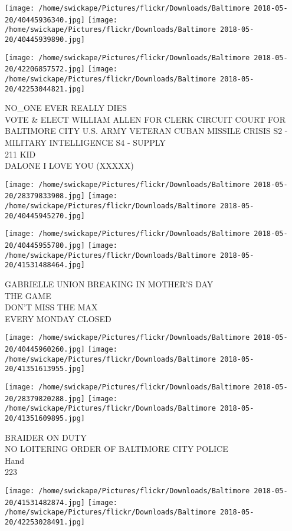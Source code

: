 \documentclass[10pt,letterpaper]{article}
\begin{document}
\texttt{[image: /home/swickape/Pictures/flickr/Downloads/Baltimore 2018-05-20/40445936340.jpg]}
\texttt{[image: /home/swickape/Pictures/flickr/Downloads/Baltimore 2018-05-20/40445939890.jpg]}

\texttt{[image: /home/swickape/Pictures/flickr/Downloads/Baltimore 2018-05-20/42206857572.jpg]}
\texttt{[image: /home/swickape/Pictures/flickr/Downloads/Baltimore 2018-05-20/42253044821.jpg]}

NO\_ONE EVER REALLY DIES\\
VOTE \& ELECT WILLIAM ALLEN FOR CLERK CIRCUIT COURT FOR BALTIMORE CITY U.S. ARMY VETERAN CUBAN MISSILE CRISIS S2 {-} MILITARY INTELLIGENCE S4 {-} SUPPLY\\
211 KID\\
DALONE I LOVE YOU (XXXXX)
\pagebreak

\texttt{[image: /home/swickape/Pictures/flickr/Downloads/Baltimore 2018-05-20/28379833908.jpg]}
\texttt{[image: /home/swickape/Pictures/flickr/Downloads/Baltimore 2018-05-20/40445945270.jpg]}

\texttt{[image: /home/swickape/Pictures/flickr/Downloads/Baltimore 2018-05-20/40445955780.jpg]}
\texttt{[image: /home/swickape/Pictures/flickr/Downloads/Baltimore 2018-05-20/41531488464.jpg]}

GABRIELLE UNION BREAKING IN MOTHER'S DAY\\
THE GAME\\
DON'T MISS THE MAX\\
EVERY MONDAY CLOSED
\pagebreak

\texttt{[image: /home/swickape/Pictures/flickr/Downloads/Baltimore 2018-05-20/40445960260.jpg]}
\texttt{[image: /home/swickape/Pictures/flickr/Downloads/Baltimore 2018-05-20/41351613955.jpg]}

\texttt{[image: /home/swickape/Pictures/flickr/Downloads/Baltimore 2018-05-20/28379820288.jpg]}
\texttt{[image: /home/swickape/Pictures/flickr/Downloads/Baltimore 2018-05-20/41351609895.jpg]}

BRAIDER ON DUTY\\
NO LOITERING ORDER OF BALTIMORE CITY POLICE\\
Hand\\
223
\pagebreak

\texttt{[image: /home/swickape/Pictures/flickr/Downloads/Baltimore 2018-05-20/41531482874.jpg]}
\texttt{[image: /home/swickape/Pictures/flickr/Downloads/Baltimore 2018-05-20/42253028491.jpg]}
\end{document}
